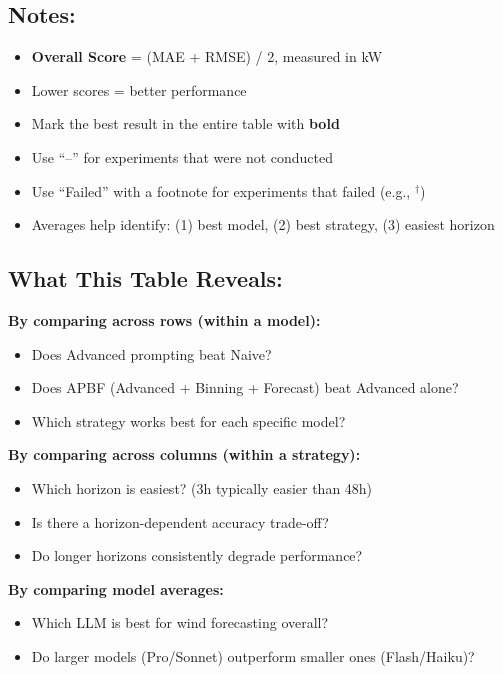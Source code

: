 \documentclass{article}
\begin{document}
\vspace{0.5cm}

\subsection*{Notes:}
\begin{itemize}
\item \textbf{Overall Score} = (MAE + RMSE) / 2, measured in kW
\item Lower scores = better performance
\item Mark the best result in the entire table with \textbf{bold}
\item Use ``--'' for experiments that were not conducted
\item Use ``Failed'' with a footnote for experiments that failed (e.g., $^{\dagger}$)
\item Averages help identify: (1) best model, (2) best strategy, (3) easiest horizon
\end{itemize}

\subsection*{What This Table Reveals:}

\textbf{By comparing across rows (within a model):}
\begin{itemize}
\item Does Advanced prompting beat Naive?
\item Does APBF (Advanced + Binning + Forecast) beat Advanced alone?
\item Which strategy works best for each specific model?
\end{itemize}

\textbf{By comparing across columns (within a strategy):}
\begin{itemize}
\item Which horizon is easiest? (3h typically easier than 48h)
\item Is there a horizon-dependent accuracy trade-off?
\item Do longer horizons consistently degrade performance?
\end{itemize}

\textbf{By comparing model averages:}
\begin{itemize}
\item Which LLM is best for wind forecasting overall?
\item Do larger models (Pro/Sonnet) outperform smaller ones (Flash/Haiku)?
\end{itemize}
\end{document}
